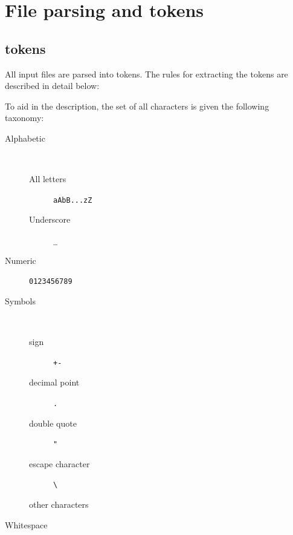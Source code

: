 \documentclass{article}
\begin{document}
\section{File parsing and tokens}

\subsection{tokens}

All input files are parsed into tokens. The rules for extracting the tokens are described in detail below:

To aid in the description, the set of all characters is given the following taxonomy:

\begin{description}
\item[Alphabetic] ~
	\begin{description} 
	\item[All letters] \texttt{aAbB...zZ}
	\item[Underscore] \texttt{\_}
	\end{description}
\item[Numeric] \texttt{0123456789}
\item[Symbols] ~
	\begin{description}
	\item[sign] \texttt{+-}
	\item[decimal point] \texttt{.}
	\item[double quote] \texttt{"}
	\item[escape character] \texttt{\textbackslash}
	\item[other characters]
	\end{description}
\item[Whitespace] 
\end{description}

\vspace{5mm}
\end{document}

